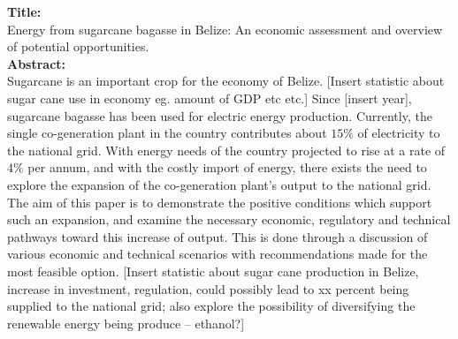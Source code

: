 \documentclass[12pt]{article}
\begin{document}
\noindent
\textbf{Title:} \\

Energy from sugarcane bagasse in Belize: An economic assessment and overview of potential opportunities. \\

\noindent\textbf{Abstract:}\\
Sugarcane is an important crop for the economy of Belize. [Insert statistic about sugar cane use in economy eg. amount of GDP etc etc.] Since [insert year], sugarcane bagasse has been used for electric energy production. Currently, the single co-generation plant in the country contributes about $15\%$ of electricity to the national grid. With energy needs of the country projected to rise at a rate of $4\%$ per annum, and with the costly import of energy, there exists the need to explore the expansion of the co-generation plant's output to the national grid. The aim of this paper is to demonstrate the positive conditions which support such an expansion, and examine the necessary economic, regulatory and technical pathways toward this increase of output. This is done through a discussion of various economic and technical scenarios with recommendations made for the most feasible option. [Insert statistic about sugar cane production in Belize, increase in investment, regulation, could possibly lead to xx percent being supplied to the national grid; also explore the possibility of diversifying the renewable energy being produce -- ethanol?]
\end{document}
